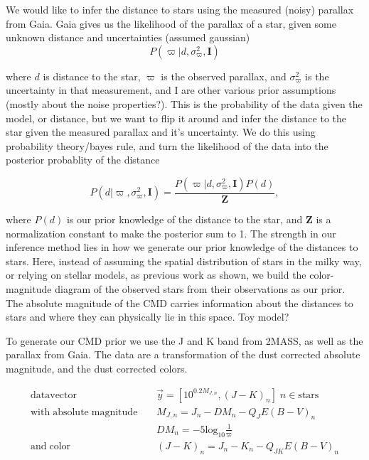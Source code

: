 \documentclass[12pt, preprint]{aastex6}
\begin{document}
We would like to infer the distance to stars using the measured (noisy) parallax from Gaia. Gaia gives us the likelihood of the parallax of a star, given some unknown distance and uncertainties (assumed gaussian)
\begin{equation}
\label{eq:likelihood}
P(\varpi |d, \sigma^2_{\varpi}, \textbf{I})
\end{equation}

where $d$ is distance to the star, $\varpi$ is the observed parallax, and $\sigma^2_{\varpi}$ is the uncertainty in that measurement, and I are other various prior assumptions (mostly about the noise properties?). This is the probability of the data given the model, or distance, but we want to flip it around and infer the distance to the star given the measured parallax and it's uncertainty. We do this using probability theory/bayes rule, and turn the likelihood of the data into the posterior probablity of the distance

\begin{equation}
\label{eq:bayes}
P(d|\varpi, \sigma^2_{\varpi}, \textbf{I}) = \frac{P(\varpi |d, \sigma^2_{\varpi}, \textbf{I}) P(d)}{\textbf{Z}},
\end{equation}

where $P(d)$ is our prior knowledge of the distance to the star, and $\textbf{Z}$ is a normalization constant to make the posterior sum to 1. The strength in our inference method lies in how we generate our prior knowledge of the distances to stars. Here, instead of assuming the spatial distribution of stars in the milky way, or relying on stellar models, as previous work as shown, we build the color-magnitude diagram of the observed stars from their observations as our prior. The absolute magnitude of the CMD carries information about the distances to stars and where they can physically lie in this space. Toy model?

To generate our CMD prior we use the J and K band from 2MASS, as well as the parallax from Gaia. The data are a transformation of the dust corrected absolute magnitude, and the dust corrected colors.

\begin{equation}
\label{eq:data}
\begin{aligned}
\mathrm{data vector} \;\;\;\; &\vec{y} = [10^{0.2M_{J,n}}, (J- K)_n] \;  n \in \mathrm{stars} \\
\mathrm{with \; absolute \; magnitude} \;\;\;\; &M_{J,n} = J_n - DM_n - Q_JE(B-V)_n \\
& DM_n = -5\mathrm{log_{10}}\frac{1}{\varpi} \\
\mathrm{and \; color} \;\;\;\; &(J - K)_n = J_n - K_n - Q_{JK}E(B-V)_n

\end{aligned}
\end{equation}
\end{document}
